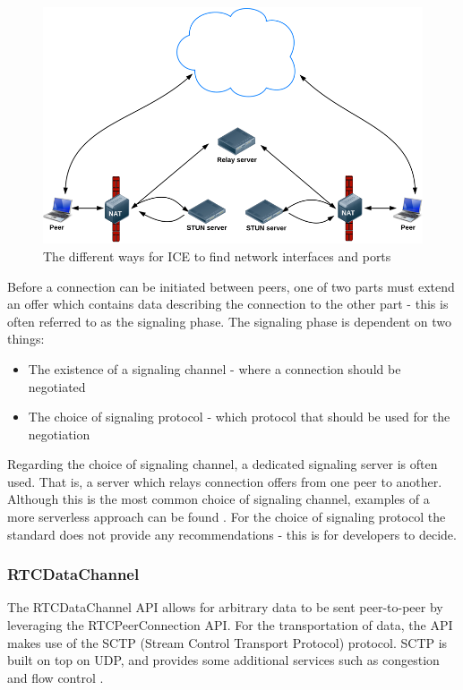 \begin{figure}[htp]
\centering
\includegraphics[width=\textwidth,height=0.25\paperheight,keepaspectratio
]{figures/ICE}
\caption{The different ways for ICE to find network interfaces and ports \cite{WebRTCBasics:2012:Online}}
\label{fig:ICE}
\end{figure}

Before a connection can be initiated between peers, one of two parts must extend an offer which contains data describing the connection to the other part - this is often referred to as the signaling phase. The signaling phase is dependent on two things:

\begin{itemize}
  \item The existence of a signaling channel - where a connection should be negotiated
  \item The choice of signaling protocol - which protocol that should be used for the negotiation
\end{itemize}

Regarding the choice of signaling channel, a dedicated signaling server is often used. That is, a server which relays connection offers from one peer to another. Although this is the most common choice of signaling channel, examples of a more serverless approach can be found \cite{webrtcsignalserver}. For the choice of signaling protocol the standard does not provide any recommendations - this is for developers to decide.


\subsubsection{RTCDataChannel}
The RTCDataChannel API allows for arbitrary data to be sent peer-to-peer by leveraging the RTCPeerConnection API. For the transportation of data, the API makes use of the SCTP (Stream Control Transport Protocol) protocol. SCTP is built on top on UDP, and provides some additional services such as congestion and flow control \cite{HighPerfBrowserNetworking:Online}.

